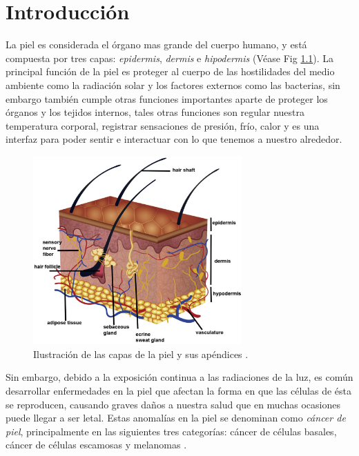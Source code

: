 
\chapter{Introducción}

La piel es considerada el órgano mas grande del cuerpo humano,  y está compuesta por tres capas: \emph{\gls{epidermis}}, \emph{\gls{dermis}} e \emph{\gls{hipodermis}} (Véase Fig \ref{fig:skin1_jpg}). La principal función de la piel es proteger al cuerpo de las hostilidades del medio ambiente como la radiación solar y los factores externos como las bacterias, sin embargo también cumple otras funciones importantes aparte de proteger los órganos y los tejidos internos, tales otras funciones son regular nuestra temperatura corporal, registrar sensaciones de presión, frío, calor y es una interfaz para poder sentir e interactuar con lo que tenemos a nuestro alrededor.


\begin{figure}[h!]
    \includegraphics[width=80mm, scale = 0.5]{Figuras/skin_structure1.jpg}
    \centering
    \caption{Ilustración de las capas de la piel y sus apéndices \citep{skin_1}.}
    \label{fig:skin1_jpg}
\end{figure}

Sin embargo, debido a la exposición continua a las radiaciones de la luz, es común desarrollar enfermedades en la piel que afectan la forma en que las células de ésta se reproducen, causando graves daños a nuestra salud que en muchas ocasiones puede llegar a ser letal. Estas anomalías en la piel se denominan como \emph{cáncer de piel}, principalmente en las siguientes tres categorías: cáncer de células basales, cáncer de células escamosas y melanomas \citep{cancer_org}.

